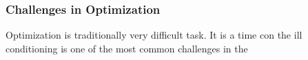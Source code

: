 \subsubsection{Challenges in Optimization}

Optimization is traditionally very difficult task. It is a time con
the ill conditioning is one of the most common challenges in the 